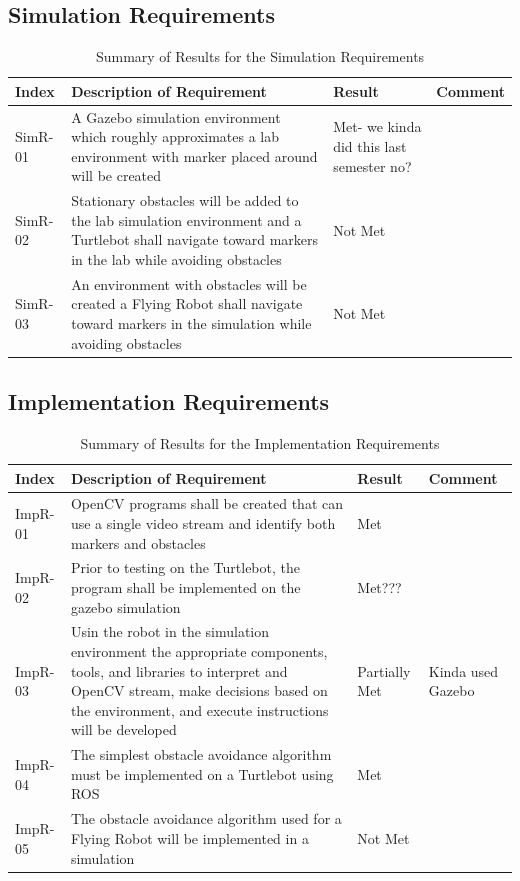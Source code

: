 \documentclass{article}
\begin{document}
    \subsection{Simulation Requirements}

	\begin{table}
	    \small
		\begin{tabular}{p{2cm} p{8cm} p{2cm} p{3cm}}
			\hline
			{\textbf{Index}} & {\textbf{Description of Requirement}} & {\textbf{Result}} & {\textbf{Comment}} \\ \hline
SimR-01 & A Gazebo simulation environment which roughly approximates a lab environment with marker placed around will be created & Met- we kinda did this last semester no? \\
SimR-02 & Stationary obstacles will be added to the lab simulation environment and a Turtlebot shall navigate toward markers in the lab while avoiding obstacles & Not Met \\
SimR-03 & An environment with obstacles will be created a Flying Robot shall navigate toward markers in the simulation while avoiding obstacles & Not Met\\ \hline
		\end{tabular}
		\caption{Summary of Results for the Simulation Requirements}
		\label{table:simresults}
    \end{table}

    \subsection{Implementation Requirements}
    
	\begin{table}
	    \small
		\begin{tabular}{p{2cm} p{8cm} p{2cm} p{3cm}}
			\hline
			{\textbf{Index}} & {\textbf{Description of Requirement}} & {\textbf{Result}} & {\textbf{Comment}} \\ \hline 
ImpR-01 & OpenCV programs shall be created that can use a single video stream and identify both markers and obstacles & Met \\ 
ImpR-02 & Prior to testing on the Turtlebot, the program shall be implemented on the gazebo simulation & Met??? \\
ImpR-03 & Usin the robot in the simulation environment the appropriate components, tools, and libraries to interpret and OpenCV stream, make decisions based on the environment, and execute instructions will be developed & Partially Met & Kinda used Gazebo \\
ImpR-04 & The simplest obstacle avoidance algorithm must be implemented on a Turtlebot using ROS & Met \\
ImpR-05 & The obstacle avoidance algorithm used for a Flying Robot will be implemented in a simulation & Not Met \\ \hline
		\end{tabular}
		\caption{Summary of Results for the Implementation Requirements}
		\label{table:impresults}
    \end{table}
    
\end{document}
